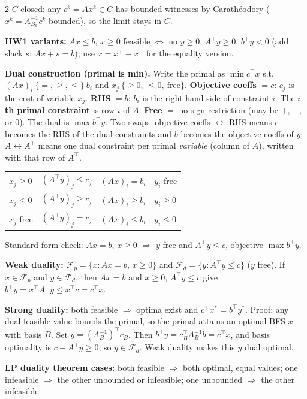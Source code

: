 \documentclass{article}
\newcommand{\sect}[1]{\par\vspace{1.2pt}{\fontsize{8}{9.2}\selectfont\textbf{#1}}\par\vspace{0.2pt}}
\newcommand{\kw}[1]{\textbf{#1}}
\begin{document}
\begin{multicols}{2}
$C$ closed: any $c^k=Ax^k\in C$ has bounded witnesses by Carath\'eodory ($x^k=A_{B_k}^{-1}c^k$ bounded), so the limit stays in $C$.

\kw{HW1 variants:} $Ax\le b$, $x\ge 0$ feasible $\Leftrightarrow$ no $y\ge 0$, $A^\top y\ge 0$, $b^\top y<0$ (add slack $s$: $Ax+s=b$); use $x=x^+-x^-$ for the equality version.

\sect{3. LP Duality}
\kw{Dual construction (primal is min).}
Write the primal as $\min c^\top x$ s.t.\ $(Ax)_i\ \{=,\ge,\le\}\ b_i$ and $x_j\ \{\ge 0,\ \le 0,\ \text{free}\}$.
\kw{Objective coeffs} $=c$: $c_j$ is the cost of variable $x_j$.
\kw{RHS} $=b$: $b_i$ is the right-hand side of constraint $i$.
The \kw{$i$th primal constraint} is row $i$ of $A$.
\kw{Free} $=$ no sign restriction (may be $+$, $-$, or $0$).
The dual is $\max b^\top y$. Two swaps: objective coeffs $\leftrightarrow$ RHS means $c$ becomes the RHS of the dual constraints and $b$ becomes the objective coeffs of $y$; $A\leftrightarrow A^\top$ means one dual constraint per primal \emph{variable} (column of $A$), written with that row of $A^\top$.

\noindent\begin{tabular}{@{}ll@{\qquad}ll@{}}
$x_j\ge 0$ & $(A^\top y)_j\le c_j$ & $(Ax)_i=b_i$ & $y_i$ free\\
$x_j\le 0$ & $(A^\top y)_j\ge c_j$ & $(Ax)_i\ge b_i$ & $y_i\ge 0$\\
$x_j$ free & $(A^\top y)_j=c_j$ & $(Ax)_i\le b_i$ & $y_i\le 0$\\
\end{tabular}

\noindent Standard-form check: $Ax=b$, $x\ge 0$ $\Rightarrow$ $y$ free and $A^\top y\le c$, objective $\max b^\top y$.

\kw{Weak duality:} $\mathcal{F}_p=\{x:Ax=b,\,x\ge 0\}$ and $\mathcal{F}_d=\{y:A^\top y\le c\}$ ($y$ free). If $x\in\mathcal{F}_p$ and $y\in\mathcal{F}_d$, then $Ax=b$ and $x\ge 0$, $A^\top y\le c$ give
$b^\top y=x^\top A^\top y\le x^\top c=c^\top x$.

\kw{Strong duality:} both feasible $\Rightarrow$ optima exist and $c^\top x^*=b^\top y^*$. Proof: any dual-feasible value bounds the primal, so the primal attains an optimal BFS $x$ with basis $B$. Set $y=(A_B^{-1})^\top c_B$. Then $b^\top y=c_B^\top A_B^{-1}b=c^\top x$, and basis optimality is $c-A^\top y\ge 0$, so $y\in\mathcal{F}_d$. Weak duality makes this $y$ dual optimal.

\kw{LP duality theorem cases:} both feasible $\Rightarrow$ both optimal, equal values; one infeasible $\Rightarrow$ the other unbounded or infeasible; one unbounded $\Rightarrow$ the other infeasible.


\end{multicols}
\end{document}
